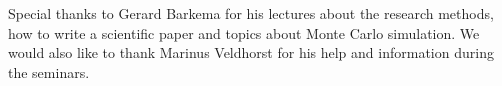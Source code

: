 Special thanks to Gerard Barkema for his lectures about the research methods, how to write a scientific paper and topics about Monte Carlo simulation. We would also like to thank Marinus Veldhorst for his help and information during the seminars.